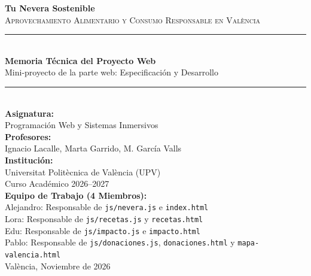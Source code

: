 \documentclass[11pt,a4paper]{article}
\begin{document}
\begin{titlepage}
    \centering
    \vspace*{1cm}
    
    {\Huge \textbf{Tu Nevera Sostenible}}\\[0.4cm]
    {\Large \textsc{Aprovechamiento Alimentario y Consumo Responsable en València}}\\[1.5cm]
    
    \rule{\linewidth}{0.8mm}\\[0.4cm]
    {\LARGE \textbf{Memoria Técnica del Proyecto Web}}\\[0.2cm]
    {\large Mini-proyecto de la parte web: Especificación y Desarrollo}\\[0.4cm]
    \rule{\linewidth}{0.8mm}\\[2cm]
    
    \textbf{Asignatura:}\\
    Programación Web y Sistemas Inmersivos\\[0.3cm]
    
    \textbf{Profesores:}\\
    Ignacio Lacalle, Marta Garrido, M. García Valls\\[0.8cm]
    
    \textbf{Institución:}\\
    Universitat Politècnica de València (UPV)\\
    Curso Académico 2026--2027\\[1.5cm]
    
    \textbf{Equipo de Trabajo (4 Miembros):}\\
    Alejandro: Responsable de \texttt{js/nevera.js} e \texttt{index.html}\\
    Lora: Responsable de \texttt{js/recetas.js} y \texttt{recetas.html}\\
    Edu: Responsable de \texttt{js/impacto.js} e \texttt{impacto.html}\\
    Pablo: Responsable de \texttt{js/donaciones.js}, \texttt{donaciones.html} y \texttt{mapa-valencia.html}\\[1.5cm]
    
    \vfill
    {\small València, Noviembre de 2026}
\end{titlepage}

\newpage
\tableofcontents
\newpage

\end{document}
